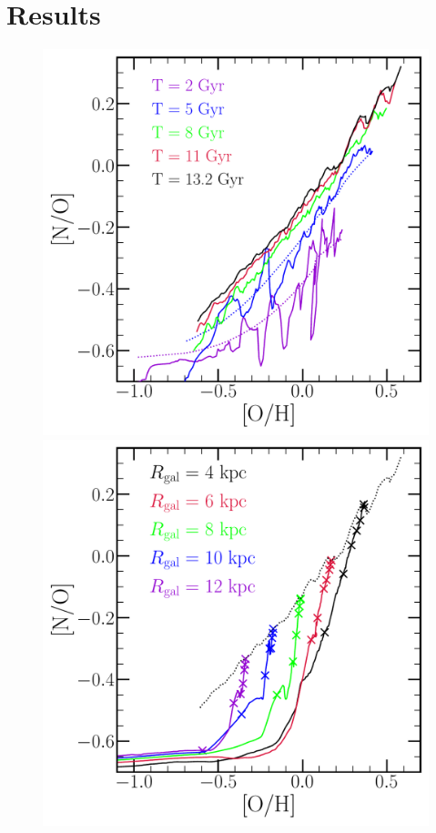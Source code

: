 \documentclass[ms.tex]{subfiles}
\begin{document}
 

\section{Results} 
\label{sec:results} 

\begin{figure} 
\centering 
\includegraphics[scale = 0.45]{no_oh_timeevol.pdf} 
\includegraphics[scale = 0.45]{no_oh_superposition.pdf} 

\end{figure}
\end{document}
